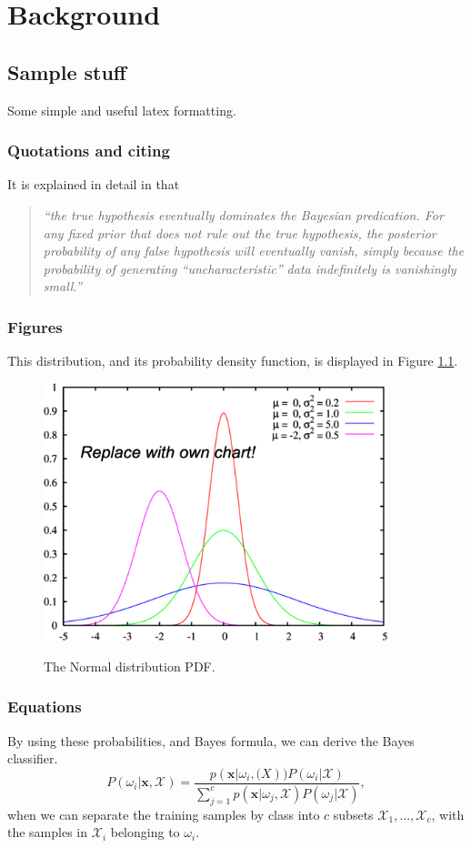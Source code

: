 \chapter{Background}
\label{ch:background}

\section{Sample stuff}
Some simple and useful latex formatting.

\subsection{Quotations and citing}
It is explained in detail in \cite[Ch.20]{Norvig03} that 
\begin{quotation}
\noindent \textit{``the true hypothesis eventually dominates the Bayesian predication. For any fixed prior that does not rule out the true hypothesis, the posterior probability of any false hypothesis will eventually vanish, simply because the probability of generating ``uncharacteristic'' data indefinitely is vanishingly small.''}
\end{quotation}
\subsection{Figures}
This distribution, and its probability density function, is displayed in Figure \ref{fig:gaussian_distr_pdf}.
\begin{figure}[ht]
	\center\includegraphics[width=10cm]{images/normal_distr_pdf}	
	\label{fig:gaussian_distr_pdf}
	\caption{The Normal distribution PDF.}
\end{figure}

\subsection{Equations}
By using these probabilities, and Bayes formula, we can derive the Bayes classifier.
\begin{equation}
	P(\omega_i | \boldsymbol{x}, \mathcal{X}) = \frac{p(\boldsymbol{x}|\omega_i, \mathcal(X))P(\omega_i|\mathcal{X})}{\sum_{j=1}^{c}p(\boldsymbol{x}|\omega_j, \mathcal{X})P(\omega_j|\mathcal{X})},
	\label{eq:bayes_formula_1}
\end{equation}
when we can separate the training samples by class into $c$ subsets $\mathcal{X}_1, \ldots, \mathcal{X}_c$, with the samples in $\mathcal{X}_i$ belonging to $\omega_i$.

